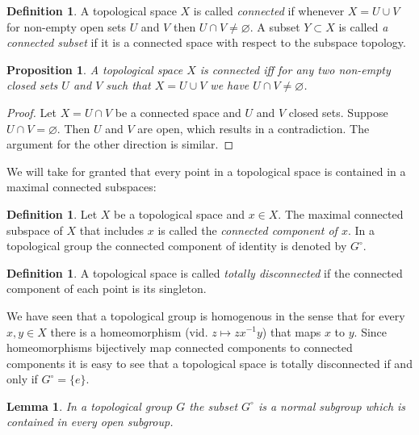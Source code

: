 \documentclass[12pt]{article}
\newtheorem{prop}[thm]{Proposition}
\newtheorem{lem}[thm]{Lemma}
\theoremstyle{definition}
\newtheorem{dfn}[thm]{Definition}
\theoremstyle{remark}
\newcommand{\gcirc}{G^\circ}
\begin{document}
    \begin{dfn}
        A topological space $X$ is called \emph{connected} if whenever $X=U\cup V$ for non-empty open sets $U$ and $V$ then $U\cap V\neq\varnothing$. A subset $Y\subset X$ is called \emph{a connected subset} if it is a connected space with respect to the subspace topology.
    \end{dfn}

    \begin{prop}
        A topological space $X$ is connected iff for any two non-empty closed sets $U$ and $V$ such that $X=U\cup V$ we have $U\cap V\neq\varnothing$.
    \end{prop}
    \begin{proof}
        Let $X=U\cap V$ be a connected space and $U$ and $V$ closed sets. Suppose $U\cap V=\varnothing$. Then $U$ and $V$ are open, which results in a contradiction. The argument for the other direction is similar.
    \end{proof}

    We will take for granted that every point in a topological space is contained in a maximal connected subspaces:
    \begin{dfn}
        Let $X$ be a topological space and $x\in X$. The maximal connected subspace of $X$ that includes $x$ is called the \emph{connected component of $x$}. In a topological group the connected component of identity is denoted by $G^\circ$.
    \end{dfn}

    \begin{dfn}
        A topological space is called \emph{totally disconnected} if the connected component of each point is its singleton.
    \end{dfn}

    We have seen that a topological group is homogenous in the sense that for every $x,y\in X$ there is a homeomorphism (vid. $z\mapsto zx^{-1}y$) that maps $x$ to $y$. Since homeomorphisms bijectively map connected components to connected components it is easy to see that a topological space is totally disconnected if and only if $G^\circ=\{e\}$.

    \begin{lem}\label{lem:gcirc}
        In a topological group $G$ the subset $\gcirc$ is a normal subgroup which is contained in every open subgroup.
    \end{lem}
\end{document}
